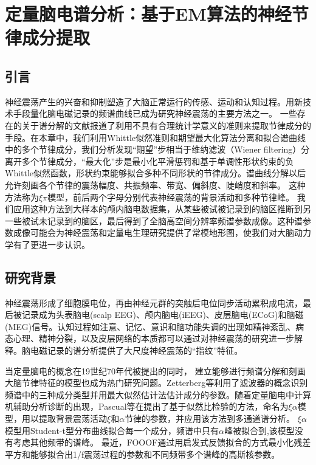 \chapter{定量脑电谱分析：基于EM算法的神经节律成分提取}

\section{引言}
神经震荡产生的兴奋和抑制塑造了大脑正常运行的传感、运动和认知过程。用新技术手段量化脑电磁记录的频谱曲线已成为研究神经震荡的主要方法之一。 一些存在的关于谱分解的文献报道了利用不具有合理统计学意义的准则来提取节律成分的手段。在本章中，我们利用Whittle似然准则和期望最大化算法分离和拟合谱曲线中的多个节律成分，我们分析发现“期望”步相当于维纳滤波（Wiener filtering）分离开多个节律成分，“最大化”步是最小化平滑惩罚和基于单调性形状约束的负Whittle似然函数，形状约束能够拟合多种不同形状的节律成分。谱曲线分解以后允许刻画各个节律的震荡幅度、共振频率、带宽、偏斜度、陡峭度和斜率。 这种方法称为$\xi\pi$模型，前后两个字母分别代表神经震荡的背景活动和多种节律峰。 我们应用这种方法到大样本的颅内脑电数据集，从某些被试被记录到的脑区推断到另一些被试未记录到的脑区，最后得到了全脑高空间分辨率频谱参数成像。这种谱参数成像可能会为神经震荡和定量电生理研究提供了常模地形图，使我们对大脑动力学有了更进一步认识。

\section{研究背景}
神经震荡形成了细胞膜电位，再由神经元群的突触后电位同步活动累积成电流，最后被记录成为头表脑电(scalp EEG)、颅内脑电(iEEG)、皮层脑电(ECoG)和脑磁(MEG)信号。认知过程如注意、记忆、意识和脑功能失调的出现如精神紊乱、病态心理、精神分裂，以及皮层网络的本质都可以通过对神经震荡的研究进一步解释。脑电磁记录的谱分析提供了大尺度神经震荡的“指纹”特征。

当定量脑电的概念在19世纪70年代被提出的同时，
建立能够进行频谱分解和刻画大脑节律特征的模型也成为热门研究问题。Zetterberg等利用了滤波器的概念识别频谱中的三种成分类型并用最大似然估计法估计成分的参数。随着定量脑电中计算机辅助分析诊断的出现，Pascual等在\cite{pascual1988parametric}提出了基于似然比检验的方法，命名为$\xi\alpha$模型，用以提取背景震荡活动$\xi$和$\alpha$节律的参数，并应用该方法到多通道谱分析。 $\xi\alpha$模型用Student-t型分布曲线拟合每一个成分，频谱中只有$\alpha$峰被拟合到,该模型没有考虑其他频带的谱峰。 最近，FOOOF通过用启发式反馈拟合的方式最小化残差平方和能够拟合出1/f震荡过程的参数和不同频带多个谱峰的高斯核参数。

